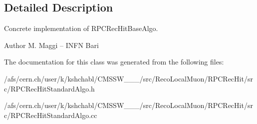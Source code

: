 \subsection{Detailed Description}
Concrete implementation of R\-P\-C\-Rec\-Hit\-Base\-Algo.

\begin{DoxyAuthor}{Author}
M. Maggi -- I\-N\-F\-N Bari 
\end{DoxyAuthor}


The documentation for this class was generated from the following files\-:\begin{DoxyCompactItemize}
\item 
/afs/cern.\-ch/user/k/kshchabl/\-C\-M\-S\-S\-W\-\_\-\_\-\_/src/\-Reco\-Local\-Muon/\-R\-P\-C\-Rec\-Hit/src/R\-P\-C\-Rec\-Hit\-Standard\-Algo.\-h\item 
/afs/cern.\-ch/user/k/kshchabl/\-C\-M\-S\-S\-W\-\_\-\_\-\_/src/\-Reco\-Local\-Muon/\-R\-P\-C\-Rec\-Hit/src/R\-P\-C\-Rec\-Hit\-Standard\-Algo.\-cc\end{DoxyCompactItemize}
